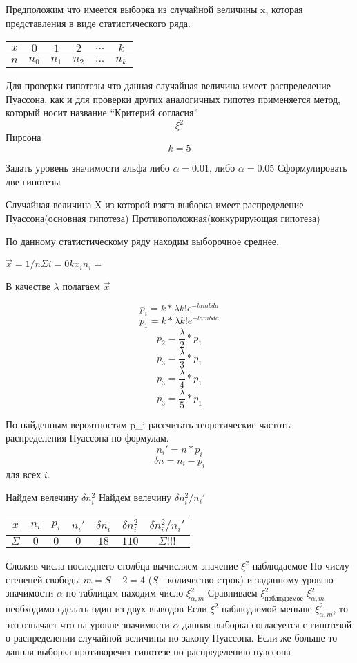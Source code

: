 \documentclass[a4paper]{article}
\begin{document}
Предположим что имеется выборка из случайной величины x, которая представления в виде статистического ряда.

\begin{table}[H]
    \centering
    \begin{tabular}{|c|c|c|c|c|c|}
        \hline
        $x$ & $0$ & $1$ & $2$ & $...$ & $k$ \\
        \hline
        $n$ & $n_0$ & $n_1$ & $n_2$ & $...$ & $n_k$ \\
        \hline
    \end{tabular}
\end{table}

Для проверки гипотезы что данная случайная величина имеет распределение Пуассона, как и для проверки других аналогичных гипотез применяется метод, который носит название ``Критерий согласия'' $$\xi^2$$ Пирсона
$$ k = 5 $$

Задать уровень значимости альфа либо $\alpha = 0.01$, либо $\alpha = 0.05$ 
Сформулировать две гипотезы

    Случайная величина X из которой взята выборка имеет распределение Пуассона(основная гипотеза)
    Противоположная(конкурирующая гипотеза)

По данному статистическому ряду находим выборочное среднее.

$\vec{x} = 1 / n \Sigma i=0 k x_i n_i = $ 

В качестве $\lambda$ полагаем $\vec{x}$

$$ p_i = k * \lambda k! e^{-lambda} $$
$$ p_1 = k * \lambda k! e^{-lambda} $$
$$ p_2 = \frac{\lambda}{2} * p_1 $$
$$ p_3 = \frac{\lambda}{3} * p_1 $$
$$ p_3 = \frac{\lambda}{4} * p_1 $$
$$ p_3 = \frac{\lambda}{5} * p_1 $$

По найденным вероятностям p_i рассчитать теоретические частоты распределения Пуассона по формулам.
$$ n_i' = n * p_i $$
$$ \delta n = n_i - p_i $$ 
для всех $i$.

Найдем велечину $ \delta n_i^2 $
Найдем велечину $ \delta n_i^2 / n_i' $

\begin{table}[H]
    \centering
    \begin{tabular}{|c|c|c|c|c|c|c|}
        \hline
        $x$ & $n_i$ & $p_i$ & $n_i'$ & $\delta n_i$ & $\delta n_i^2$ & $\delta n_i^2 / n_i' $ \\
        \hline
        $\Sigma$ & $ 0 $ & $0$ & $0$ & $18$ & $110$ & $\Sigma!!!$\\
        \hline
    \end{tabular}
\end{table}

Сложив числа последнего столбца вычисляем значение $\xi^2$ наблюдаемое 
По числу степеней свободы $m = S - 2 = 4$ ($S$ - количество строк) и заданному уровню значимости $\alpha$ по таблицам находим число $\xi^2_{\alpha, m}$
Сравниваем $\xi^2_{\text{наблюдаемое}}$ $\xi^2_{\alpha, m}$ необходимо сделать один из двух выводов
Если $\xi^2$ наблюдаемой меньше $\xi^2_{\alpha, m}$, то это означает что на уровне значимости $\alpha$ данная выборка согласуется с гипотезой о распределении случайной величины по закону Пуассона. Если же больше то данная выборка противоречит гипотезе по распределению пуассона
\end{document}
